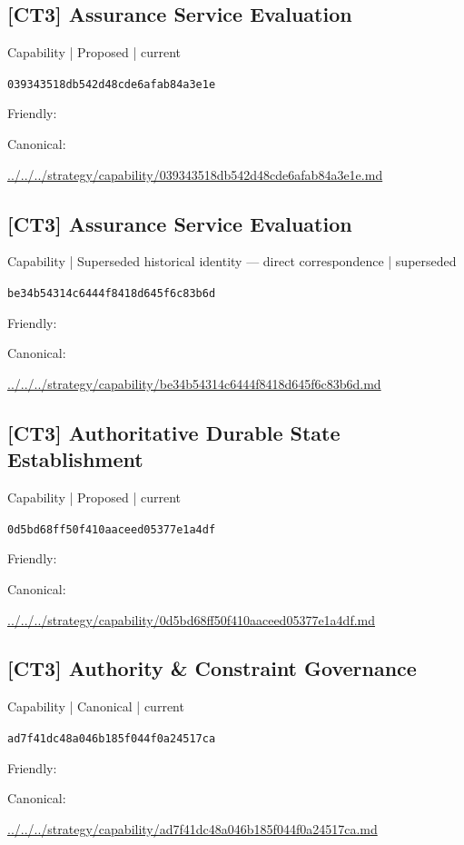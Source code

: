 \documentclass[10pt,a4paper]{article}
\begin{document}
\subsection*{[CT3] Assurance Service Evaluation}
{\small Capability | Proposed | current}\par
\texttt{039343518db542d48cde6afab84a3e1e}\par
Friendly: \par
Canonical: \par
{\footnotesize\url{../../../strategy/capability/039343518db542d48cde6afab84a3e1e.md}}\par
\subsection*{[CT3] Assurance Service Evaluation}
{\small Capability | Superseded historical identity — direct correspondence | superseded}\par
\texttt{be34b54314c6444f8418d645f6c83b6d}\par
Friendly: \par
Canonical: \par
{\footnotesize\url{../../../strategy/capability/be34b54314c6444f8418d645f6c83b6d.md}}\par
\subsection*{[CT3] Authoritative Durable State Establishment}
{\small Capability | Proposed | current}\par
\texttt{0d5bd68ff50f410aaceed05377e1a4df}\par
Friendly: \par
Canonical: \par
{\footnotesize\url{../../../strategy/capability/0d5bd68ff50f410aaceed05377e1a4df.md}}\par
\subsection*{[CT3] Authority \& Constraint Governance}
{\small Capability | Canonical | current}\par
\texttt{ad7f41dc48a046b185f044f0a24517ca}\par
Friendly: \par
Canonical: \par
{\footnotesize\url{../../../strategy/capability/ad7f41dc48a046b185f044f0a24517ca.md}}\par
\end{document}
